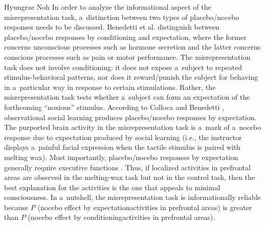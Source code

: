 \begin{artengenv}{Hyungrae Noh}
In order to analyze the informational aspect of the misrepresentation task, a~distinction between two types of placebo/nocebo responses needs to be discussed. Benedetti et al.
\parencite*[][]{benedetti_conscious_2003} %
 distinguish between placebo/nocebo responses by conditioning and expectation, where the former concerns unconscious processes such as hormone secretion and the latter concerns conscious processes such as pain or motor performance. The misrepresentation task does not involve conditioning: it does not expose a~subject to repeated stimulus-behavioral patterns, nor does it reward/punish the subject for behaving in a~particular way in response to certain stimulations. Rather, the misrepresentation task tests whether a~subject can form an expectation of the forthcoming ``noxious'' stimulus. According to Colloca and Benedetti 
\parencite*[][]{colloca_placebo_2009}, %
 observational social learning produces placebo/nocebo responses by expectation. The purported brain activity in the misrepresentation task is a~mark of a~nocebo response due to expectation produced by social learning (i.e., the instructor displays a~painful facial expression when the tactile stimulus is paired with melting wax). Most importantly, placebo/nocebo responses by expectation generally require executive functions 
\parencite[][p.239]{benedetti_how_2011}. %
 Thus, if localized activities in prefrontal areas are observed in the melting-wax task but not in the control task, then the best explanation for the activities is the one that appeals to minimal consciousness. In a~nutshell, the misrepresentation task is informationally reliable because $P$ (nocebo effect by expectation{\textbar}activities in prefrontal areas) is greater than $P$ (nocebo effect by conditioning{\textbar}activities in prefrontal areas).


\end{artengenv}
